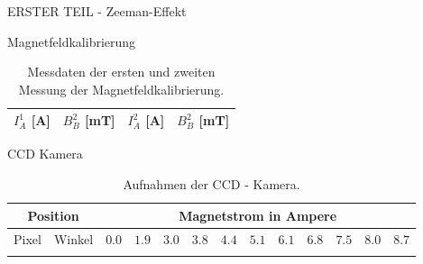 \begin{appendix}
  \label{Anhang}
  
  
  
  \begin{chapter}{ERSTER TEIL - Zeeman-Effekt}
    \label{Anhang:chp:ERSTERTEIL}
    
    
    
    \begin{section}{Magnetfeldkalibrierung}
      \label{Anhang:chp:ERSTERTEILmagnetfeld}
      
      \begin{table}[htbp]
        \centering
        \footnotesize
        \begin{tabular}{|c|c|c|c|}
          \hline
          $I_{A}^{1}$ [A] & $B_{B}^{2}$ [mT] & $I_{A}^{2}$ [A] & $B_{B}^{2}$ 
              [mT] \\ \hline
          
        \end{tabular}
        \caption{Messdaten der ersten und zweiten Messung der 
            Magnetfeldkalibrierung.}
        \label{tab:Magnetfeldkalibrierung}
      \end{table}
      
    \end{section}
    
    
    
    \begin{section}{CCD Kamera}
      \label{Anhang:chp:ERSTERTEILccd}
      
      \begin{scriptsize}
        \begin{longtable}[htbp]{|c|c|c|c|c|c|c|c|c|c|c|c|c|}
          \hline
          \multicolumn{2}{|c|}{Position} & \multicolumn{11}{|c|}{Magnetstrom 
              in Ampere}\\ \hline
          Pixel & Winkel & $0.0$ & $1.9$ & $3.0$ & $3.8$ & $4.4$ & $5.1$ & 
              $6.1$ & $6.8$ & $7.5$ & $8.0$ & $8.7$ \\ \hline\hline \endhead
          
          \caption{Aufnahmen der CCD - Kamera.}
          \label{tab:CCD}
        \end{longtable}
      \end{scriptsize}
      

\end{section}
\end{chapter}
\end{appendix}
